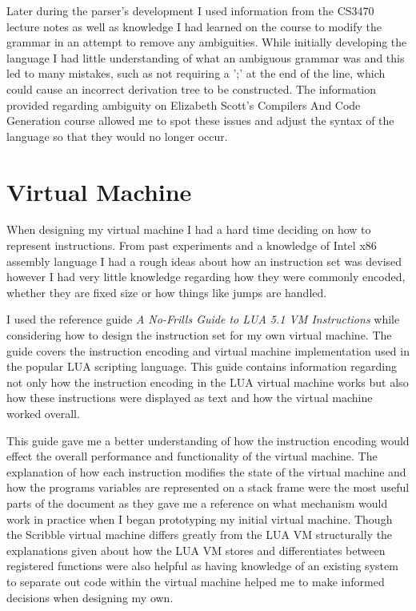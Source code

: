 \documentclass[]{final_report}
\begin{document}
Later during the parser's development I used information from the CS3470 lecture notes\cite{CS3470} as well as knowledge I had learned on the course to modify the grammar in an attempt to remove any ambiguities. While initially developing the language I had little understanding of what an ambiguous grammar was and this led to many mistakes, such as not requiring a ';' at the end of the line, which could cause an incorrect derivation tree to be constructed. The information provided regarding ambiguity on Elizabeth Scott's Compilers And Code Generation course allowed me to spot these issues and adjust the syntax of the language so that they would no longer occur.

\section{Virtual Machine}

When designing my virtual machine I had a hard time deciding on how to represent instructions. From past experiments and a knowledge of Intel x86 assembly language I had a rough ideas about how an instruction set was devised however I had very little knowledge regarding how they were commonly encoded, whether they are fixed size or how things like jumps are handled.

I used the reference guide \emph{A No-Frills Guide to LUA 5.1 VM Instructions}\cite{NOFRILLLUA} while considering how to design the instruction set for my own virtual machine. The guide covers the instruction encoding and virtual machine implementation used in the popular LUA scripting language. This guide contains information regarding not only how the instruction encoding in the LUA virtual machine works but also how these instructions were displayed as text and how the virtual machine worked overall.

This guide gave me a better understanding of how the instruction encoding would effect the overall performance and functionality of the virtual machine. The explanation of how each instruction modifies the state of the virtual machine and how the programs variables are represented on a stack frame were the most useful parts of the document as they gave me a reference on what mechanism would work in practice when I began prototyping my initial virtual machine. Though the Scribble virtual machine differs greatly from the LUA VM structurally the explanations given about how the LUA VM stores and differentiates between registered functions were also helpful as having knowledge of an existing system to separate out code within the virtual machine helped me to make informed decisions when designing my own.
\end{document}
